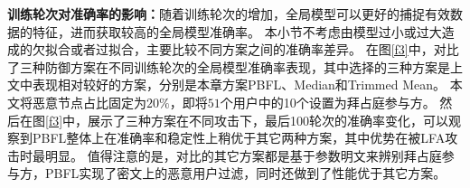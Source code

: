 \textbf{训练轮次对准确率的影响：}随着训练轮次的增加，全局模型可以更好的捕捉有效数据的特征，进而获取较高的全局模型准确率。
本小节不考虑由模型过小或过大造成的欠拟合或者过拟合，主要比较不同方案之间的准确率差异。
在图\ref{f3}中，对比了三种防御方案在不同训练轮次的全局模型准确率表现，其中选择的三种方案是上文中表现相对较好的方案，分别是本章方案PBFL、Median和Trimmed Mean。
本文将恶意节点占比固定为$20\%$，即将$51$个用户中的10个设置为拜占庭参与方。
然后在图\ref{f3}中，展示了三种方案在不同攻击下，最后100轮次的准确率变化，可以观察到PBFL整体上在准确率和稳定性上稍优于其它两种方案，其中优势在被LFA攻击时最明显。
值得注意的是，对比的其它方案都是基于参数明文来辨别拜占庭参与方，PBFL实现了密文上的恶意用户过滤，同时还做到了性能优于其它方案。

\begin{figure}[htb]
	\centering


\end{figure}
